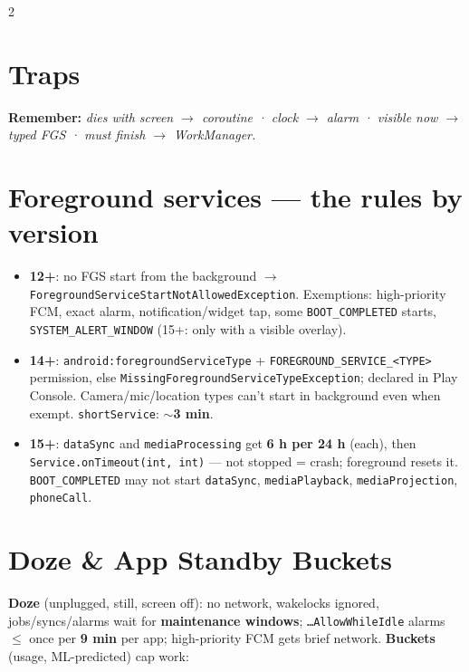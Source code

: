 \documentclass[8pt]{extarticle}
\begin{document}
\begin{multicols}{2}
\section{Traps}
\begin{itemize}\raggedright
\end{itemize}

\textbf{Remember:} \emph{dies with screen $\to$ coroutine · clock $\to$ alarm · visible now $\to$
typed FGS · must finish $\to$ WorkManager.}

\columnbreak

\section{Foreground services — the rules by version}
\begin{itemize}\raggedright
  \item \textbf{12+}: no FGS start from the background $\to$
        \texttt{ForegroundServiceStartNotAllowedException}. Exemptions: high-priority FCM,
        exact alarm, notification/widget tap, some \texttt{BOOT\_COMPLETED} starts,
        \texttt{SYSTEM\_ALERT\_WINDOW} (15+: only with a visible overlay).
  \item \textbf{14+}: \texttt{android:foregroundServiceType} + \texttt{FOREGROUND\_SERVICE\_<TYPE>}
        permission, else \texttt{MissingForegroundServiceTypeException}; declared in Play Console.
        Camera/mic/location types can't start in background even when exempt.
        \texttt{shortService}: $\sim$\textbf{3 min}.
  \item \textbf{15+}: \texttt{dataSync} and \texttt{mediaProcessing} get \textbf{6 h per 24 h}
        (each), then \texttt{Service.onTimeout(int, int)} — not stopped = crash; foreground resets
        it. \texttt{BOOT\_COMPLETED} may not start \texttt{dataSync}, \texttt{mediaPlayback},
        \texttt{mediaProjection}, \texttt{phoneCall}.
\end{itemize}

\section{Doze \& App Standby Buckets}
\raggedright \textbf{Doze} (unplugged, still, screen off): no network, wakelocks ignored,
jobs/syncs/alarms wait for \textbf{maintenance windows}; \texttt{…AllowWhileIdle} alarms $\leq$
once per \textbf{9 min} per app; high-priority FCM gets brief network. \textbf{Buckets} (usage,
ML-predicted) cap work:


\end{multicols}
\end{document}
